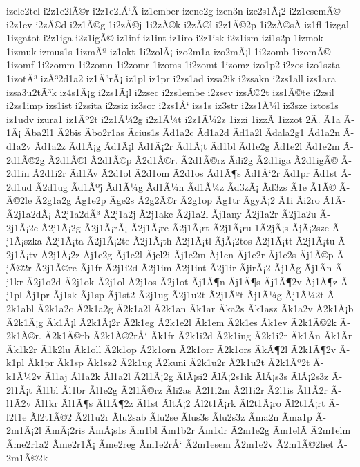{izele2tel
i2z1e2lÃ©r
i2z1e2lÅ‘Ã­
iz1ember
izene2g
izen3n
ize2s1Ã¡2
i2z1esemÃ©
i2z1ev
i2zÃ©d
i2z1Ã©g
1i2zÃ©j
1i2zÃ©k
i2zÃ©l
i2z1Ã©2p
1i2zÃ©sÃ­
iz1fl
1izgal
1izgatot
i2z1iga
i2z1igÃ©
iz1inf
iz1int
iz1iro
i2z1isk
i2z1ism
izi1s2p
1izmok
1izmuk
izmus1s
1izmÃº
iz1okt
1i2zolÃ¡
izo2m1a
izo2mÃ¡l
1i2zomb
1izomÃ©
1izomf
1i2zomm
1i2zomn
1i2zomr
1izoms
1i2zomt
1izomz
izo1p2
i2zos
izo1szta
1izotÃ³
izÃ³2d1a2
iz1Ã³rÃ¡
iz1pl
iz1pr
i2zs1ad
izsa2ik
i2zsakn
i2zs1all
izs1ara
izsa3u2tÃ³k
iz4s1Ã¡g
i2zs1Ã¡l
i2zsec
i2zs1embe
i2zsev
izsÃ©2t
izs1Ã©te
i2zsil
i2zs1imp
izs1ist
i2zsita
i2zsiz
iz3sor
i2zs1Å‘
izs1s
iz3str
i2zs1Ã¼l
iz3sze
iztos1s
iz1udv
izura1
iz1Ãº2t
i2z1Ã¼2g
i2z1Ã¼t
i2z1Ã¼2z
1izzi
1izzÃ­
1izzot
2Ã­.
Ã­1a
Ã­1Ã¡
Ã­ba2l1
Ã­2bis
Ã­bo2r1as
Ã­cius1s
Ã­d1a2c
Ã­d1a2d
Ã­d1a2l
Ã­dala2g1
Ã­d1a2n
Ã­d1a2v
Ã­d1a2z
Ã­d1Ã¡g
Ã­d1Ã¡l
Ã­d1Ã¡2r
Ã­d1Ã¡t
Ã­d1bl
Ã­d1e2g
Ã­d1e2l
Ã­d1e2m
Ã­2d1Ã©2g
Ã­2d1Ã©l
Ã­2d1Ã©p
Ã­2d1Ã©r.
Ã­2d1Ã©rz
Ã­di2g
Ã­2d1iga
Ã­2d1igÃ©
Ã­2d1in
Ã­2d1i2r
Ã­d1Ã­v
Ã­2d1ol
Ã­2d1om
Ã­2d1os
Ã­d1Ã¶s
Ã­d1Å‘2r
Ã­d1pr
Ã­d1st
Ã­2d1ud
Ã­2d1ug
Ã­d1Ãºj
Ã­d1Ã¼g
Ã­d1Ã¼n
Ã­d1Ã¼z
Ã­d3zÃ¡
Ã­d3zs
Ã­1e
Ã­1Ã©
Ã­Ã©2le
Ã­2g1a2g
Ã­g1e2p
Ã­ge2s
Ã­2g2Ã©r
Ã­2g1op
Ã­g1tr
Ã­gyÃ¡2
Ã­1i
Ã­i2ro
Ã­1Ã­
Ã­2j1a2dÃ¡
Ã­2j1a2dÃ³
Ã­2j1a2j
Ã­2j1akc
Ã­2j1a2l
Ã­j1any
Ã­2j1a2r
Ã­2j1a2u
Ã­2j1Ã¡2c
Ã­2j1Ã¡2g
Ã­2j1Ã¡rÃ¡
Ã­2j1Ã¡re
Ã­2j1Ã¡rt
Ã­2j1Ã¡ru
1Ã­2jÃ¡s
Ã­jÃ¡2sze
Ã­j1Ã¡szka
Ã­2j1Ã¡ta
Ã­2j1Ã¡2te
Ã­2j1Ã¡th
Ã­2j1Ã¡tl
Ã­jÃ¡2tos
Ã­2j1Ã¡tt
Ã­2j1Ã¡tu
Ã­2j1Ã¡tv
Ã­2j1Ã¡2z
Ã­j1e2g
Ã­j1e2l
Ã­jel2i
Ã­j1e2m
Ã­j1en
Ã­j1e2r
Ã­j1e2s
Ã­j1Ã©p
Ã­jÃ©2r
Ã­2j1Ã©re
Ã­j1fr
Ã­2j1i2d
Ã­2j1im
Ã­2j1int
Ã­2j1ir
Ã­jirÃ¡2
Ã­j1Ã­g
Ã­j1Ã­n
Ã­j1kr
Ã­2j1o2d
Ã­2j1ok
Ã­2j1ol
Ã­2j1os
Ã­2j1ot
Ã­j1Ã¶n
Ã­j1Ã¶s
Ã­j1Ã¶2v
Ã­j1Ã¶z
Ã­j1pl
Ã­j1pr
Ã­j1sk
Ã­j1sp
Ã­j1st2
Ã­2j1ug
Ã­2j1u2t
Ã­2j1Ãºt
Ã­j1Ã¼g
Ã­j1Ã¼2t
Ã­2k1abl
Ã­2k1a2c
Ã­2k1a2g
Ã­2k1a2l
Ã­2k1an
Ã­k1ar
Ã­ka2s
Ã­k1asz
Ã­k1a2v
Ã­2k1Ã¡b
Ã­2k1Ã¡g
Ã­k1Ã¡l
Ã­2k1Ã¡2r
Ã­2k1eg
Ã­2k1e2l
Ã­k1em
Ã­2k1es
Ã­k1ev
Ã­2k1Ã©2k
Ã­2k1Ã©r.
Ã­2k1Ã©rb
Ã­2k1Ã©2rÅ‘
Ã­k1fr
Ã­2k1i2d
Ã­2k1ing
Ã­2k1i2r
Ã­k1Ã­n
Ã­k1Ã­r
Ã­k1k2r
Ã­1k2lu
Ã­k1oll
Ã­2k1op
Ã­2k1orn
Ã­2k1orr
Ã­2k1ors
Ã­kÃ¶2l
Ã­2k1Ã¶2v
Ã­k1pl
Ã­k1pr
Ã­k1sp
Ã­k1sz2
Ã­2k1ug
Ã­2kuni
Ã­2k1u2r
Ã­2k1u2t
Ã­2k1Ãº2t
Ã­k1Ã¼2v
Ã­l1aj
Ã­l1a2k
Ã­l1a2l
Ã­2l1Ã¡2g
Ã­lÃ¡si2
Ã­lÃ¡2s1ik
Ã­lÃ¡s3s
Ã­lÃ¡2s3z
Ã­2l1Ã¡t
Ã­l1bl
Ã­l1br
Ã­l1e2g
Ã­2l1Ã©rz
Ã­li2as
Ã­2l1i2m
Ã­2l1i2r
Ã­2l1is
Ã­l1Ã­2r
Ã­l1Ã­2v
Ã­l1kr
Ã­l1Ã¶s
Ã­l1Ã¶2z
Ã­l1st
Ã­ltÃ¡2
Ã­l2t1Ã¡rk
Ã­l2t1Ã¡ro
Ã­l2t1Ã¡rt
Ã­l2t1e
Ã­l2t1Ã©2
Ã­2l1u2r
Ã­lu2sab
Ã­lu2se
Ã­lus3s
Ã­lu2s3z
Ã­ma2n
Ã­ma1p
Ã­2m1Ã¡2l
Ã­mÃ¡2ris
Ã­mÃ¡s1s
Ã­m1bl
Ã­m1b2r
Ã­m1dr
Ã­2m1e2g
Ã­m1elÃ­
Ã­2m1elm
Ã­me2r1a2
Ã­me2r1Ã¡
Ã­me2reg
Ã­m1e2rÅ‘
Ã­2m1esem
Ã­2m1e2v
Ã­2m1Ã©2het
Ã­2m1Ã©2k
}

